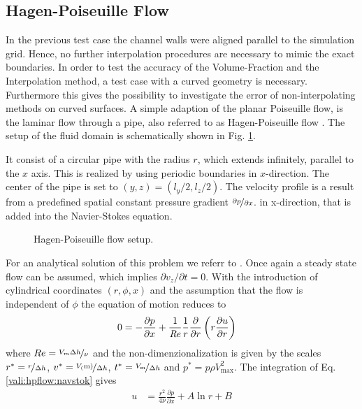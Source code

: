 \subsection{Hagen-Poiseuille Flow}

In the previous test case the channel walls were aligned parallel to the simulation grid. Hence, no further interpolation procedures
are necessary to mimic the exact boundaries.
In order to test the accuracy of the Volume-Fraction and the Interpolation method, a test case with a curved geometry is necessary.
Furthermore this gives the possibility to investigate the error of non-interpolating methods on curved surfaces.
A simple adaption of the planar Poiseuille flow, is the laminar flow through a pipe, also referred to as Hagen-Poiseuille flow \citep{tritton88}.
The setup of the fluid domain is schematically shown in Fig. \ref{validation:setup_hpflow}.

It consist of a circular pipe with the radius $r$, which extends infinitely, parallel to the $x$ axis.
This is realized by using periodic boundaries in $x$-direction.
The center of the pipe is set to $(y, z) = (l_y/2, l_z/2)$.
The velocity profile is a result from a predefined spatial constant pressure gradient $\nicefrac{\partial p}{\partial x}$.
in x-direction, that is added into the Navier-Stokes equation.


\begin{figure}[!bp]
      \centering
      \caption{Hagen-Poiseuille flow setup.
                \label{validation:setup_hpflow}
      }
\end{figure}

For an analytical solution of this problem we referr to \citep{Kundu2012}.
Once again a steady state flow can be assumed, which implies $\partial v_z/\partial t = 0$. With the introduction of cylindrical coordinates $(r, \phi, x)$
and the assumption that the flow is independent of $\phi$ the equation of motion reduces to
\begin{align}
    \label{vali:hpflow:navstok}
        0 &= - \frac{\partial p}{\partial x}  +  \frac{1}{\mbox{\textit{Re}}} \frac{1}{r}\frac{\partial}{\partial r}\left(r\frac{\partial u}{\partial r}\right)
\end{align}
where $Re = \nicefrac{V_{m}\Delta h}{\nu}$
and the non-dimenzionalization is given by the scales
    $r^* = \nicefrac{r}{\Delta h}$, $v^*=\nicefrac{V_(\text{m})}{\Delta h}$,
    $t^* = \nicefrac{V_{\text{m}}}{\Delta h}$ and $p^* = p \rho V_{\text{max}}^2$.
The integration of Eq. \ref{vali:hpflow:navstok} gives
\begin{align}
    u &= \frac{r^2}{4\nu}\frac{\partial p}{\partial x} + A \ln r + B
\end{align}

